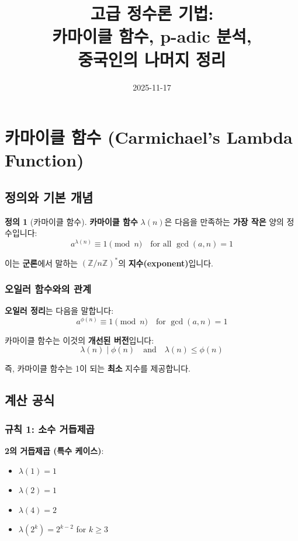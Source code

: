 \documentclass[11pt,a4paper]{article}
\title{\textbf{고급 정수론 기법:\\카마이클 함수, p-adic 분석,\\중국인의 나머지 정리}}
\author{}
\date{2025-11-17}
\theoremstyle{definition}
\newtheorem{definition}[theorem]{정의}
\theoremstyle{remark}
\begin{document}
\maketitle

\tableofcontents
\newpage

\section{카마이클 함수 (Carmichael's Lambda Function)}

\subsection{정의와 기본 개념}

\begin{definition}[카마이클 함수]
\textbf{카마이클 함수} $\lambda(n)$은 다음을 만족하는 \textbf{가장 작은} 양의 정수입니다:
\[a^{\lambda(n)} \equiv 1 \pmod{n} \quad \text{for all } \gcd(a,n) = 1\]

이는 \textbf{군론}에서 말하는 $(\mathbb{Z}/n\mathbb{Z})^*$의 \textbf{지수(exponent)}입니다.
\end{definition}

\subsubsection{오일러 함수와의 관계}

\textbf{오일러 정리}는 다음을 말합니다:
\[a^{\phi(n)} \equiv 1 \pmod{n} \quad \text{for } \gcd(a,n) = 1\]

카마이클 함수는 이것의 \textbf{개선된 버전}입니다:
\[\lambda(n) \mid \phi(n) \quad \text{and} \quad \lambda(n) \leq \phi(n)\]

즉, 카마이클 함수는 1이 되는 \textbf{최소} 지수를 제공합니다.

\subsection{계산 공식}

\subsubsection{규칙 1: 소수 거듭제곱}

\textbf{2의 거듭제곱 (특수 케이스)}:
\begin{itemize}
    \item $\lambda(1) = 1$
    \item $\lambda(2) = 1$
    \item $\lambda(4) = 2$
    \item $\lambda(2^k) = 2^{k-2}$ for $k \geq 3$
\end{itemize}
\end{document}
